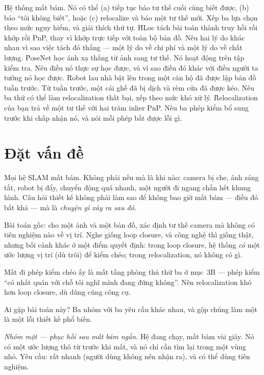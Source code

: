\documentclass[../../vslam.tex]{subfiles}
\begin{document}
\begin{khoigoi}
\h{Hệ thống mất bám. Nó có thể (a) tiếp tục báo tư thế cuối cùng biết được, (b) báo ``tôi không biết'', hoặc (c) relocalize và báo một tư thế mới. Xếp ba lựa chọn theo mức nguy hiểm, và giải thích thứ tự.}
\h{HLoc tách bài toán thành truy hồi rồi khớp rồi PnP, thay vì khớp trực tiếp với toàn bộ bản đồ. Nêu hai lý do khác nhau vì sao việc tách đó thắng --- một lý do về chi phí và một lý do về chất lượng.}
\h{PoseNet học ánh xạ thẳng từ ảnh sang tư thế. Nó hoạt động trên tập kiểm tra. Nêu điều nó thực sự học được, và vì sao điều đó khác với điều người ta tưởng nó học được.}
\h{Robot lau nhà bật lên trong một căn hộ đã được lập bản đồ tuần trước. Từ tuần trước, một cái ghế đã bị dịch và rèm cửa đã được kéo. Nêu ba thứ có thể làm relocalization thất bại, xếp theo mức khó xử lý.}
\h{Relocalization của bạn trả về một tư thế với hai trăm inlier PnP. Nêu ba phép kiểm bổ sung trước khi chấp nhận nó, và nói mỗi phép bắt được lỗi gì.}
\end{khoigoi}

\section{Đặt vấn đề}

Mọi hệ SLAM mất bám. Không phải nếu mà là khi nào: camera bị che, ánh sáng tắt, robot bị đẩy, chuyển động quá nhanh, một người đi ngang chắn hết khung hình. Câu hỏi thiết kế không phải làm sao để không bao giờ mất bám --- điều đó bất khả --- mà là \emph{chuyện gì xảy ra sau đó}.

Bài toán gốc: cho một ảnh và một bản đồ, xác định tư thế camera mà không có tiên nghiệm nào về vị trí. Nghe giống loop closure, và công nghệ thì giống thật, nhưng bối cảnh khác ở một điểm quyết định: trong loop closure, hệ thống \emph{có} một ước lượng vị trí (dù trôi) để kiểm chéo; trong relocalization, nó không có gì.

Mất đi phép kiểm chéo ấy là mất tầng phòng thủ thứ ba ở  mục~3B --- phép kiểm ``có nhất quán với chỗ tôi nghĩ mình đang đứng không''. Nên relocalization khó hơn loop closure, dù dùng cùng công cụ.

Ai gặp bài toán này? Ba nhóm với ba yêu cầu khác nhau, và gộp chúng làm một là một lỗi thiết kế phổ biến.

\emph{Nhóm một --- phục hồi sau mất bám ngắn.} Hệ đang chạy, mất bám vài giây. Nó có một ước lượng thô từ trước khi mất, và nó chỉ cần tìm lại trong một vùng nhỏ. Yêu cầu: rất nhanh (người dùng không nên nhận ra), và có thể dùng tiên nghiệm.
\end{document}
